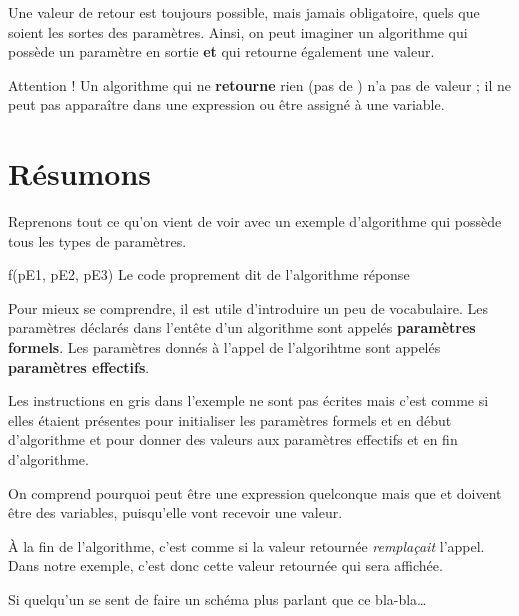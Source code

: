 	Une valeur de retour est toujours possible,
	mais jamais obligatoire,
	quels que soient les sortes des paramètres.
	Ainsi, on peut imaginer un algorithme
	qui possède un paramètre en sortie \textbf{et}
	qui retourne également une valeur.

	Attention !
	Un algorithme qui ne \textbf{retourne} rien (pas de \Gives)
	n'a pas de valeur ;
	il ne peut pas apparaître dans une expression
	ou être assigné à une variable.

\section{Résumons}

	Reprenons tout ce qu'on vient de voir
	avec un exemple d'algorithme qui possède tous les types de paramètres.

	\begin{LDA}
			\Write f(pE1, pE2, pE3)
		\EndAlgo
		\Empty
			\Empty
			\LComment Le code proprement dit de l'algorithme
			\Empty
			\Return réponse
		\EndAlgo
	\end{LDA}

	Pour mieux se comprendre,
	il est utile d'introduire un peu de vocabulaire.
	Les paramètres déclarés dans l'entête d'un algorithme
	sont appelés \textbf{paramètres formels}.
	Les paramètres donnés à l'appel de l'algorihtme
	sont appelés \textbf{paramètres effectifs}. 
	
	Les instructions en gris dans l'exemple ne sont pas écrites
	mais c'est comme si elles étaient présentes
	pour initialiser les paramètres formels \In{} et \InOut{}
	en début d'algorithme
	et pour donner des valeurs 
	aux paramètres effectifs \Out{} et \InOut{}
	en fin d'algorithme.
	
	On comprend pourquoi  peut être une expression quelconque
	mais que  et  doivent être des variables,
	puisqu'elle vont recevoir une valeur.
	
	À la fin de l'algorithme, 
	c'est comme si la valeur retournée \emph{remplaçait} l'appel.
	Dans notre exemple, c'est donc cette valeur retournée
	qui sera affichée.

	\begin{TODO}
		Si quelqu'un se sent de faire un schéma 
		plus parlant que ce bla-bla\dots
	\end{TODO}
	
